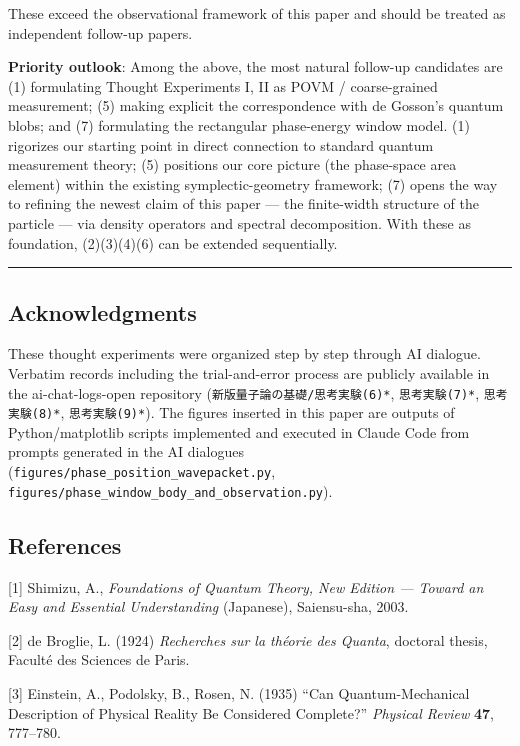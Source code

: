 \documentclass[
]{article}
\begin{document}
These exceed the observational framework of this paper and should be
treated as independent follow-up papers.

\textbf{Priority outlook}: Among the above, the most natural follow-up
candidates are (1) formulating Thought Experiments I, II as POVM /
coarse-grained measurement; (5) making explicit the correspondence with
de Gosson's quantum blobs; and (7) formulating the rectangular
phase-energy window model. (1) rigorizes our starting point in direct
connection to standard quantum measurement theory; (5) positions our
core picture (the phase-space area element) within the existing
symplectic-geometry framework; (7) opens the way to refining the newest
claim of this paper --- the finite-width structure of the particle ---
via density operators and spectral decomposition. With these as
foundation, (2)(3)(4)(6) can be extended sequentially.

\begin{center}\rule{0.5\linewidth}{0.5pt}\end{center}

\subsection{Acknowledgments}\label{acknowledgments}

These thought experiments were organized step by step through AI
dialogue. Verbatim records including the trial-and-error process are
publicly available in the ai-chat-logs-open repository
(\texttt{新版量子論の基礎/思考実験(6)*}, \texttt{思考実験(7)*},
\texttt{思考実験(8)*}, \texttt{思考実験(9)*}). The figures inserted in
this paper are outputs of Python/matplotlib scripts implemented and
executed in Claude Code from prompts generated in the AI dialogues
(\texttt{figures/phase\_position\_wavepacket.py},
\texttt{figures/phase\_window\_body\_and\_observation.py}).

\subsection{References}\label{references}

{[}1{]} Shimizu, A., \emph{Foundations of Quantum Theory, New Edition
--- Toward an Easy and Essential Understanding} (Japanese), Saiensu-sha,
2003.

{[}2{]} de Broglie, L. (1924) \emph{Recherches sur la théorie des
Quanta}, doctoral thesis, Faculté des Sciences de Paris.

{[}3{]} Einstein, A., Podolsky, B., Rosen, N. (1935) ``Can
Quantum-Mechanical Description of Physical Reality Be Considered
Complete?'' \emph{Physical Review} \textbf{47}, 777--780.
\end{document}
